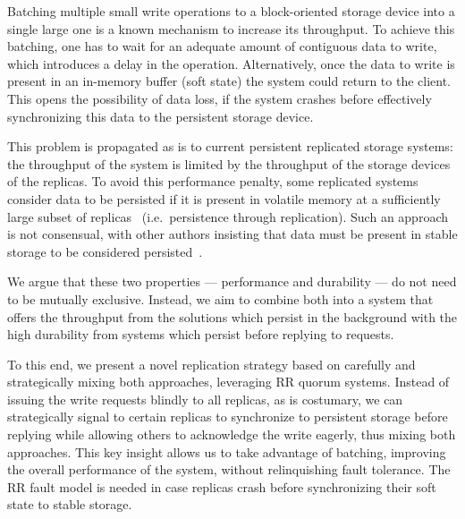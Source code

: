 
Batching multiple small write operations to a block-oriented storage device into a
single large one is a known mechanism to increase its throughput.
To achieve this batching, one has to wait for an adequate amount
of contiguous data to write, which introduces a delay in the
operation. Alternatively, once the data to write is present in
an in-memory buffer (soft state) the system could return to the
client. This opens the possibility of data loss, if the system
crashes before effectively synchronizing this data to the persistent
storage device.

%
This problem is propagated as is to current persistent replicated storage
systems: the throughput of the system is limited by the
throughput of the storage devices of the replicas. To avoid this
performance penalty, some replicated systems consider data to be persisted if it is
present in volatile memory at a sufficiently large subset of replicas~\cite{pbft}
(i.e.\ persistence through replication). Such an approach is not
consensual, with other authors insisting that data must be
present in stable storage to be considered persisted~\cite{}.

We argue that these two properties --- performance and
durability --- do not need to be mutually exclusive. Instead, we
aim to combine both into a system that offers the throughput from
the solutions which persist in the background with the high
durability from systems which persist before replying to
requests.

To this end, we present a novel replication strategy based on
carefully and strategically mixing both approaches, leveraging
\ac{RR} quorum systems. Instead of issuing the write
requests blindly to all replicas, as is costumary, we can
strategically signal to certain replicas to synchronize to
persistent storage before replying while allowing others to
acknowledge the write eagerly, thus mixing both approaches. This
key insight allows us to take advantage of batching, improving the overall
performance of the system, without relinquishing fault tolerance.
The \ac{RR} fault model is needed in case replicas crash before
synchronizing their soft state to stable storage.

